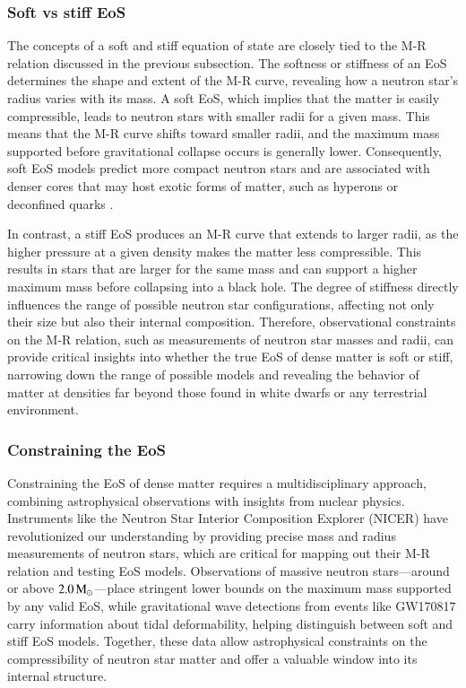 \documentclass[main.tex]{subfiles}
\begin{document}
    \subsubsection{Soft vs stiff EoS}
    The concepts of a soft and stiff equation of state are closely tied to the M-R relation discussed in the previous subsection. The softness or stiffness of an EoS determines the shape and extent of the M-R curve, revealing how a neutron star's radius varies with its mass. A soft EoS, which implies that the matter is easily compressible, leads to neutron stars with smaller radii for a given mass. This means that the M-R curve shifts toward smaller radii, and the maximum mass supported before gravitational collapse occurs is generally lower. Consequently, soft EoS models predict more compact neutron stars and are associated with denser cores that may host exotic forms of matter, such as hyperons or deconfined quarks \citep[e.g., the curves labeled SQM1-3 in Fig.~\ref{fig:M-R} represent strange-quark matter models;][]{2001ApJ...550..426L}.

    In contrast, a stiff EoS produces an M-R curve that extends to larger radii, as the higher pressure at a given density makes the matter less compressible. This results in stars that are larger for the same mass and can support a higher maximum mass before collapsing into a black hole. The degree of stiffness directly influences the range of possible neutron star configurations, affecting not only their size but also their internal composition. Therefore, observational constraints on the M-R relation, such as measurements of neutron star masses and radii, can provide critical insights into whether the true EoS of dense matter is soft or stiff, narrowing down the range of possible models and revealing the behavior of matter at densities far beyond those found in white dwarfs or any terrestrial environment.
    
    \subsubsection{Constraining the EoS}
    Constraining the EoS of dense matter requires a multidisciplinary approach, combining astrophysical observations with insights from nuclear physics. Instruments like the Neutron Star Interior Composition Explorer (NICER) have revolutionized our understanding by providing precise mass and radius measurements of neutron stars, which are critical for mapping out their M-R relation and testing EoS models. Observations of massive neutron stars---around or above $2.0\mathrm{\,M_\odot}$---place stringent lower bounds on the maximum mass supported by any valid EoS, while gravitational wave detections from events like GW170817 \citep{PhysRevLett.119.161101} carry information about tidal deformability, helping distinguish between soft and stiff EoS models. Together, these data allow astrophysical constraints on the compressibility of neutron star matter and offer a valuable window into its internal structure.
\end{document}
